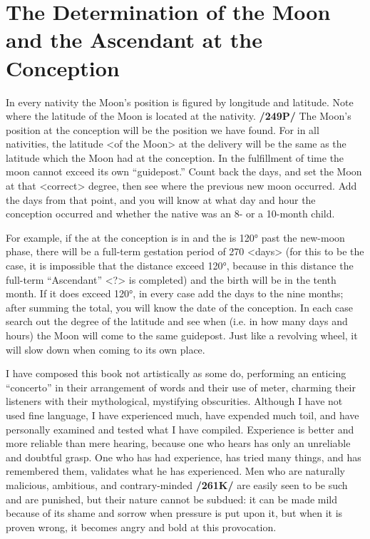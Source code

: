 \section{The Determination of the Moon and the Ascendant at the Conception}

In every nativity the Moon’s position is figured by longitude and latitude. Note where the latitude of the Moon is located at the nativity. \textbf{/249P/} The Moon’s position at the conception will be the position we
have found. For in all nativities, the latitude <of the Moon> at the delivery will be the same as the latitude which the Moon had at the conception. In the fulfillment of time the moon cannot exceed its own
“guidepost.” Count back the days, and set the Moon at that <correct> degree, then see where the previous new moon occurred. Add the days from that point, and you will know at what day and hour the conception occurred and whether the native was an 8- or a 10-month child.

For example, if the \Sun\xspace at the conception is in \Aries\xspace and the \Moon\xspace is 120° past the new-moon phase, there will be a full-term gestation period of 270 <days> (for this to be the case, it is impossible that the distance exceed 120°, because in this distance the full-term “Ascendant” <?> is completed) and the birth will be in the tenth month. If it does exceed 120°, in every case add the days to the nine months; after summing the total, you will know the date of the conception. In each case search out the degree of the latitude and see when (i.e. in how many days and hours) the Moon will come to the same guidepost. Just like a revolving wheel, it will slow down when coming to its own place. 

I have composed this book not artistically as some do, performing an enticing “concerto” in their arrangement of words and their use of meter, charming their listeners with their mythological, mystifying
obscurities. Although I have not used fine language, I have experienced much, have expended much toil, and have personally examined and tested what I have compiled. Experience is better and more reliable than mere hearing, because one who hears has only an unreliable and doubtful grasp. One who has had experience, has tried many things, and has remembered them, validates what he has experienced. Men who are naturally malicious, ambitious, and contrary-minded \textbf{/261K/} are easily seen to be such and are punished, but their nature cannot be subdued: it can be made mild because of its shame and sorrow when pressure is put upon it, but when it is proven wrong, it becomes angry and bold at this provocation.

